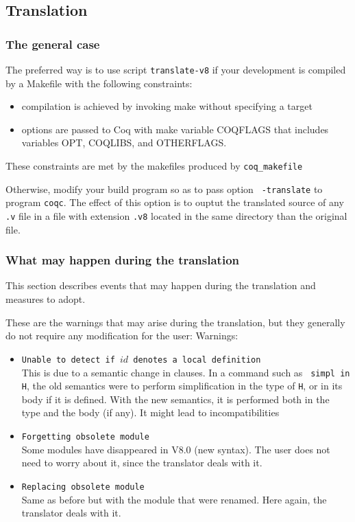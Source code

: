 \documentclass[11pt,a4paper]{article}
\begin{document}
\subsection{Translation}

\subsubsection{The general case}

The preferred way is to use script {\tt translate-v8} if your development
is compiled by a Makefile with the following constraints:
\begin{itemize}
\item compilation is achieved by invoking make without specifying a target
\item options are passed to Coq with make variable COQFLAGS that
  includes variables OPT, COQLIBS, and OTHERFLAGS.
\end{itemize}
These constraints are met by the makefiles produced by {\tt coq\_makefile}

Otherwise, modify your build program so as to pass option {\tt
-translate} to program {\tt coqc}. The effect of this option is to
ouptut the translated source of any {\tt .v} file in a file with
extension {\tt .v8} located in the same directory than the original
file.

\subsubsection{What may happen during the translation}

This section describes events that may happen during the
translation and measures to adopt.

These are the warnings that may arise during the translation, but they
generally do not require any modification for the user:
Warnings:
\begin{itemize}
\item {\tt Unable to detect if $id$ denotes a local definition}\\
This is due to a semantic change in clauses. In a command such as {\tt
simpl in H}, the old semantics were to perform simplification in the
type of {\tt H}, or in its body if it is defined. With the new
semantics, it is performed both in the type and the body (if any). It
might lead to incompatibilities

\item {\tt Forgetting obsolete module}\\
Some modules have disappeared in V8.0 (new syntax). The user does not
need to worry about it, since the translator deals with it.

\item {\tt Replacing obsolete module}\\
Same as before but with the module that were renamed. Here again, the
translator deals with it.
\end{itemize}
\end{document}

